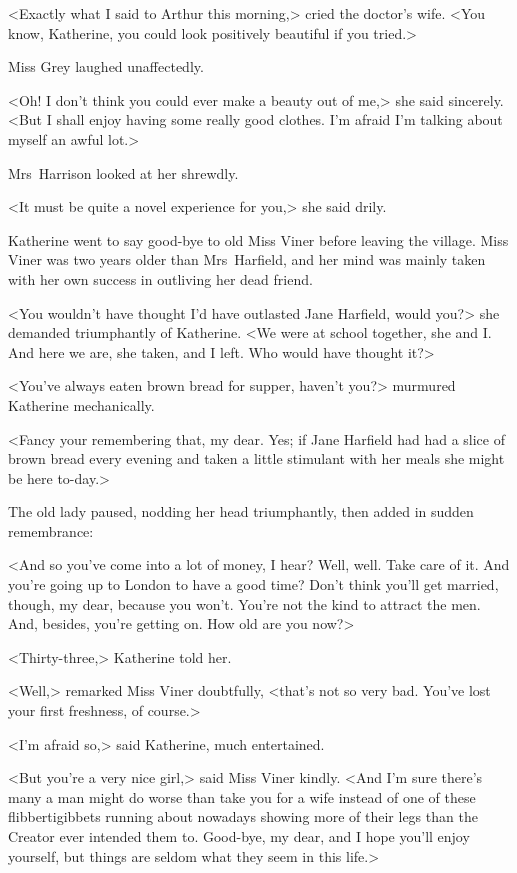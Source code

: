 <Exactly what I said to Arthur this morning,> cried the doctor's wife. <You know, Katherine, you could look positively beautiful if you tried.>

Miss Grey laughed unaffectedly.

<Oh! I don't think you could ever make a beauty out of me,> she said sincerely. <But I shall enjoy having some really good clothes. I'm afraid I'm talking about myself an awful lot.>

Mrs~Harrison looked at her shrewdly.

<It must be quite a novel experience for you,> she said drily.

Katherine went to say good-bye to old Miss Viner before leaving the village. Miss Viner was two years older than Mrs~Harfield, and her mind was mainly taken with her own success in outliving her dead friend.

<You wouldn't have thought I'd have outlasted Jane Harfield, would you?> she demanded triumphantly of Katherine. <We were at school together, she and I. And here we are, she taken, and I left. Who would have thought it?>

<You've always eaten brown bread for supper, haven't you?> murmured Katherine mechanically.

<Fancy your remembering that, my dear. Yes; if Jane Harfield had had a slice of brown bread every evening and taken a little stimulant with her meals she might be here to-day.>

The old lady paused, nodding her head triumphantly, then added in sudden remembrance:

<And so you've come into a lot of money, I hear? Well, well. Take care of it. And you're going up to London to have a good time? Don't think you'll get married, though, my dear, because you won't. You're not the kind to attract the men. And, besides, you're getting on. How old are you now?>

<Thirty-three,> Katherine told her.

<Well,> remarked Miss Viner doubtfully, <that's not so very bad. You've lost your first freshness, of course.>

<I'm afraid so,> said Katherine, much entertained.

<But you're a very nice girl,> said Miss Viner kindly. <And I'm sure there's many a man might do worse than take you for a wife instead of one of these flibbertigibbets running about nowadays showing more of their legs than the Creator ever intended them to. Good-bye, my dear, and I hope you'll enjoy yourself, but things are seldom what they seem in this life.>

